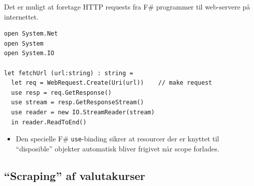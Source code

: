 \documentclass[rgb]{beamer}
\begin{document}
\begin{frame}[fragile]
\begin{footnotesize}

  Det er muligt at foretage HTTP requests fra F\# programmer til
  web-servere på internettet.

\begin{lstlisting}[numbers=none,frame=none]
open System.Net
open System
open System.IO

let fetchUrl (url:string) : string =
  let req = WebRequest.Create(Uri(url))    // make request
  use resp = req.GetResponse()
  use stream = resp.GetResponseStream()
  use reader = new IO.StreamReader(stream)
  in reader.ReadToEnd()
\end{lstlisting}


\begin{itemize}
\item Den specielle F\# \lstinline{use}-binding sikrer at resourcer
  der er knyttet til ``disposible'' objekter automatisk bliver
  frigivet når scope forlades.
\end{itemize}

\end{footnotesize}
\end{frame}

\subsection{``Scraping'' af valutakurser}
\end{document}
